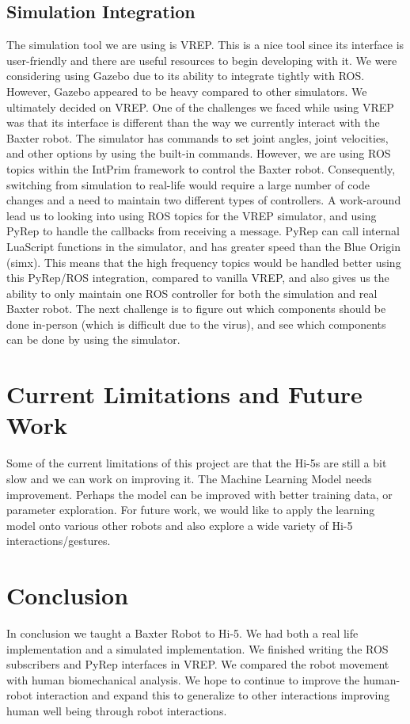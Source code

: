 \documentclass[letterpaper, 10 pt, conference]{ieeeconf}  %
\begin{document}
\subsection{Simulation Integration} 
The simulation tool we are using is VREP. This is a nice tool since its interface is user-friendly and there are useful resources to begin developing with it. We were considering using Gazebo due to its ability to integrate tightly with ROS. However, Gazebo appeared to be heavy compared to other simulators. We ultimately decided on VREP. 
\newline
\indent
One of the challenges we faced while using VREP was that its interface is different than the way we currently interact with the Baxter robot. The simulator has commands to set joint angles, joint velocities, and other options by using the built-in commands. However, we are using ROS topics within the IntPrim framework to control the Baxter robot. Consequently, switching from simulation to real-life would require a large number of code changes and a need to maintain two different types of controllers. 
\newline
\indent A work-around lead us to looking into using ROS topics for the VREP simulator, and using PyRep to handle the callbacks from receiving a message. PyRep can call internal LuaScript functions in the simulator, and has greater speed than the Blue Origin (simx). This means that the high frequency topics would be handled better using this PyRep/ROS integration, compared to vanilla VREP, and also gives us the ability to only maintain one ROS controller for both the simulation and real Baxter robot. The next challenge is to figure out which components should be done in-person (which is difficult due to the virus), and see which components can be done by using the simulator. 


\section{Current Limitations and Future Work}
Some of the current limitations of this project are that the Hi-5s are still a bit slow and we can work on improving it. The Machine Learning Model needs improvement. Perhaps the model can be improved with better training data, or parameter exploration. For future work, we would like to apply the learning model onto various other robots and also explore a wide variety of Hi-5 interactions/gestures.

\section{Conclusion}
In conclusion we taught a Baxter Robot to Hi-5. We had both a real life implementation and a simulated implementation. We finished writing the ROS subscribers and PyRep interfaces in VREP. We compared the robot movement with human biomechanical analysis. We hope to continue to improve the human-robot interaction and expand this to generalize to other interactions improving human well being through robot interactions.
\end{document}
